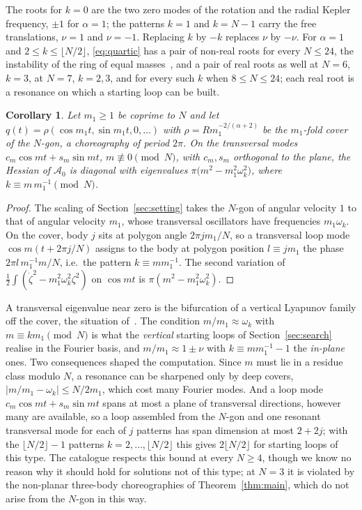 \documentclass[11pt]{amsart}
\newtheorem{corollary}[theorem]{Corollary}
\theoremstyle{definition}
\newcommand{\act}{\mathcal{A}}
\begin{document}
The roots for $k=0$ are the two zero modes of the rotation and the radial Kepler frequency, $\pm1$ for $\alpha=1$; the patterns $k=1$ and $k=N-1$ carry the free translations, $\nu=1$ and $\nu=-1$. Replacing $k$ by $-k$ replaces $\nu$ by $-\nu$. For $\alpha=1$ and $2\le k\le\lfloor N/2\rfloor$, \eqref{eq:quartic} has a pair of non-real roots for every $N\le24$, the instability of the ring of equal masses~\cite{Maxwell1859,Moeckel1995}, and a pair of real roots as well at $N=6$, $k=3$, at $N=7$, $k=2,3$, and for every such $k$ when $8\le N\le24$; each real root is a resonance on which a starting loop can be built.

\begin{corollary}\label{cor:resonance}
Let $m_1\ge1$ be coprime to $N$ and let $q(t)=\rho(\cos m_1t,\sin m_1t,0,\dots)$ with $\rho=Rm_1^{-2/(\alpha+2)}$ be the $m_1$-fold cover of the $N$-gon, a choreography of period $2\pi$. On the transversal modes $c_m\cos mt+s_m\sin mt$, $m\not\equiv0\pmod N$, with $c_m,s_m$ orthogonal to the plane, the Hessian of $\act_0$ is diagonal with eigenvalues $\pi\big(m^2-m_1^2\omega_k^2\big)$, where $k\equiv m\,m_1^{-1}\pmod N$.
\end{corollary}

\begin{proof}
The scaling of Section~\ref{sec:setting} takes the $N$-gon of angular velocity $1$ to that of angular velocity $m_1$, whose transversal oscillators have frequencies $m_1\omega_k$. On the cover, body $j$ sits at polygon angle $2\pi jm_1/N$, so a transversal loop mode $\cos m(t+2\pi j/N)$ assigns to the body at polygon position $l\equiv jm_1$ the phase $2\pi l\,m_1^{-1}m/N$, i.e.\ the pattern $k\equiv mm_1^{-1}$. The second variation of $\frac12\int(\dot\zeta^2-m_1^2\omega_k^2\zeta^2)$ on $\cos mt$ is $\pi(m^2-m_1^2\omega_k^2)$.
\end{proof}

A transversal eigenvalue near zero is the bifurcation of a vertical Lyapunov family off the cover, the situation of~\cite{ChencinerFejoz2005,ChencinerFejoz2009,GarciaAzpeitiaIze2013,CDG2018}. The condition $m/m_1\approx\omega_k$ with $m\equiv km_1\pmod N$ is what the \emph{vertical} starting loops of Section~\ref{sec:search} realise in the Fourier basis, and $m/m_1\approx1\pm\nu$ with $k\equiv mm_1^{-1}-1$ the \emph{in-plane} ones. Two consequences shaped the computation. Since $m$ must lie in a residue class modulo $N$, a resonance can be sharpened only by deep covers, $|m/m_1-\omega_k|\le N/2m_1$, which cost many Fourier modes. And a loop mode $c_m\cos mt+s_m\sin mt$ spans at most a plane of transversal directions, however many are available, so a loop assembled from the $N$-gon and one resonant transversal mode for each of $j$ patterns has span dimension at most $2+2j$; with the $\lfloor N/2\rfloor-1$ patterns $k=2,\dots,\lfloor N/2\rfloor$ this gives $2\lfloor N/2\rfloor$ for starting loops of this type. The catalogue respects this bound at every $N\ge4$, though we know no reason why it should hold for solutions not of this type; at $N=3$ it is violated by the non-planar three-body choreographies of Theorem~\ref{thm:main}, which do not arise from the $N$-gon in this way.
\end{document}
